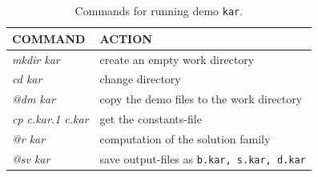 \documentclass[12pt]{report}
\begin{document}
\begin{table}[htbp]
\begin{center}
\begin{tabular}{| l | l |}
\hline
  COMMAND  & ACTION \\
\hline
  {\it mkdir kar} & create an empty work directory \\ 
  {\it cd kar} & change directory \\
  {\it @dm kar} & copy the demo files to the work directory \\
\hline
  {\it cp c.kar.1 c.kar} & get the constants-file \\ 
  {\it @r kar} & computation of the solution family \\ 
  {\it @sv kar} & save output-files as {\tt b.kar, s.kar, d.kar} \\ 
\hline
\end{tabular}
\caption{Commands for running demo {\tt kar}.}
\label{tbl:demo_kar}
\end{center}
\end{table}

\newpage
\end{document}
